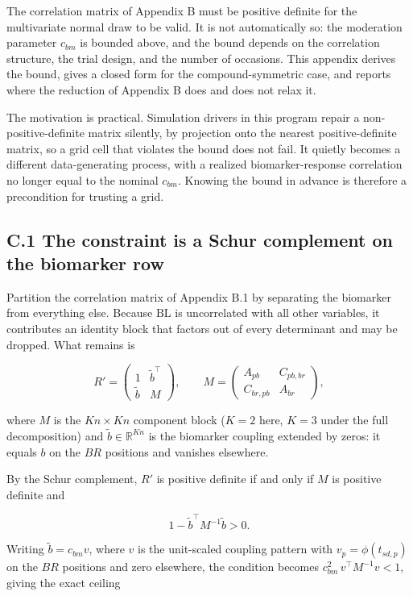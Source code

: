 \documentclass[
  11pt,
]{article}
\begin{document}
The correlation matrix of Appendix B must be positive definite for
the multivariate normal draw to be valid. It is not automatically so:
the moderation parameter \(c_{bm}\) is bounded above, and the bound
depends on the correlation structure, the trial design, and the
number of occasions. This appendix derives the bound, gives a closed
form for the compound-symmetric case, and reports where the reduction
of Appendix B does and does not relax it.

The motivation is practical. Simulation drivers in this program
repair a non-positive-definite matrix silently, by projection onto
the nearest positive-definite matrix, so a grid cell that violates
the bound does not fail. It quietly becomes a different
data-generating process, with a realized biomarker-response
correlation no longer equal to the nominal \(c_{bm}\). Knowing the
bound in advance is therefore a precondition for trusting a grid.

\subsection{C.1 The constraint is a Schur complement on the biomarker
row}

Partition the correlation matrix of Appendix B.1 by separating the
biomarker from everything else. Because \(\mathrm{BL}\) is uncorrelated
with all other variables, it contributes an identity block that
factors out of every determinant and may be dropped. What remains is

\[
R' =
\begin{pmatrix}
1 & \tilde b^{\top} \\
\tilde b & M
\end{pmatrix},
\qquad
M =
\begin{pmatrix}
A_{pb} & C_{pb,br}\\
C_{br,pb} & A_{br}
\end{pmatrix},
\]

where \(M\) is the \(Kn \times Kn\) component block (\(K = 2\) here, \(K =
3\) under the full decomposition) and \(\tilde b \in \mathbb{R}^{Kn}\)
is the biomarker coupling extended by zeros: it equals \(b\) on the
\(BR\) positions and vanishes elsewhere.

By the Schur complement, \(R'\) is positive definite if and only if \(M\)
is positive definite and

\[
1 - \tilde b^{\top} M^{-1} \tilde b > 0 .
\]

Writing \(\tilde b = c_{bm} v\), where \(v\) is the unit-scaled coupling
pattern with \(v_p = \phi(t_{sd,p})\) on the \(BR\) positions and zero
elsewhere, the condition becomes \(c_{bm}^{2}\, v^{\top} M^{-1} v <
1\), giving the exact ceiling
\end{document}
